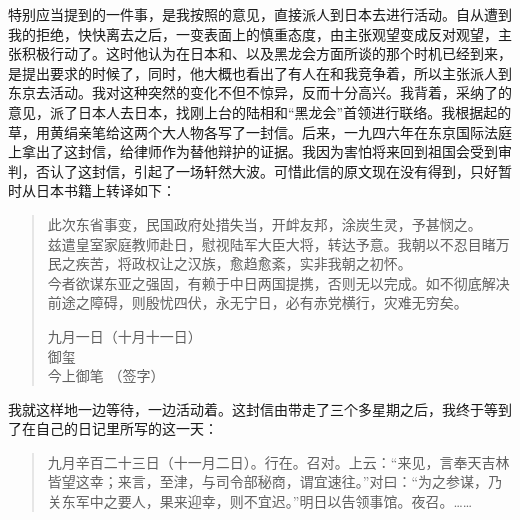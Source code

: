 特别应当提到的一件事，是我按照的意见，直接派人到日本去进行活动。自从遭到我的拒绝，快快离去之后，一变表面上的慎重态度，由主张观望变成反对观望，主张积极行动了。这时他认为在日本和、以及黑龙会方面所谈的那个时机已经到来，是提出要求的时候了，同时，他大概也看出了有人在和我竞争着，所以主张派人到东京去活动。我对这种突然的变化不但不惊异，反而十分高兴。我背着，采纳了的意见，派了日本人去日本，找刚上台的陆相和“黑龙会”首领进行联络。我根据起的草，用黄绢亲笔给这两个大人物各写了一封信。后来，一九四六年在东京国际法庭上拿出了这封信，给律师作为替他辩护的证据。我因为害怕将来回到祖国会受到审判，否认了这封信，引起了一场轩然大波。可惜此信的原文现在没有得到，只好暂时从日本书籍上转译如下：\\

\begin{quote}
	此次东省事变，民国政府处措失当，开衅友邦，涂炭生灵，予甚悯之。\\

兹遣皇室家庭教师赴日，慰视陆军大臣大将，转达予意。我朝以不忍目睹万民之疾苦，将政权让之汉族，愈趋愈紊，实非我朝之初怀。\\

今者欲谋东亚之强固，有赖于中日两国提携，否则无以完成。如不彻底解决前途之障碍，则殷忧四伏，永无宁日，必有赤党横行，灾难无穷矣。\\

\begin{flushright}
	九月一日（十月十一日）\\

御玺\\

今上御笔 （签字）\\
\end{flushright}
\end{quote}

我就这样地一边等待，一边活动着。这封信由带走了三个多星期之后，我终于等到了在自己的日记里所写的这一天：\\

\begin{quote}
	九月辛百二十三日（十一月二日）。行在。召对。上云：“来见，言奉天吉林皆望这幸；来言，至津，与司令部秘商，谓宜速往。”对曰：“为之参谋，乃关东军中之要人，果来迎幸，则不宜迟。”明日以告领事馆。夜召。……\\
\end{quote}
